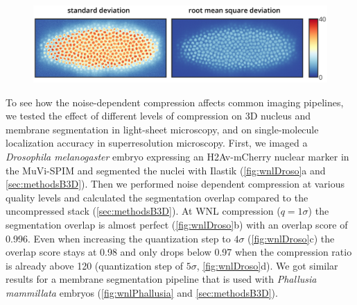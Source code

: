     \begin{figure}[tpb]
      \centering
      \includegraphics[page=1,width=1\textwidth]{SFig4_RMSDvsSD_rotated}
      \label{fig:RMSD}
    \end{figure}

    To see how the noise-dependent compression affects common imaging pipelines, we tested the effect of different levels of compression on 3D nucleus and membrane segmentation in light-sheet microscopy, and on single-molecule localization accuracy in superresolution microscopy.
    First, we imaged a \textit{Drosophila melanogaster} embryo expressing an H2Av-mCherry nuclear marker in the MuVi-SPIM and segmented the nuclei with Ilastik \cite{sommer_ilastik:_2011} (\autoref{fig:wnlDroso}a and \autoref{sec:methodsB3D}). Then we performed noise dependent compression at various quality levels and calculated the segmentation overlap compared to the uncompressed stack (\autoref{sec:methodsB3D}). At WNL compression ($q=1 \sigma$) the segmentation overlap is almost perfect (\autoref{fig:wnlDroso}b) with an overlap score of 0.996. Even when increasing the quantization step to $4\sigma$ (\autoref{fig:wnlDroso}c) the overlap score stays at 0.98 and only drops below 0.97 when the compression ratio is already above 120 (quantization step of $5\sigma$, \autoref{fig:wnlDroso}d).
    We got similar results for a membrane segmentation pipeline that is used with \textit{Phallusia mammillata} embryos (\autoref{fig:wnlPhallusia} and \autoref{sec:methodsB3D}).

